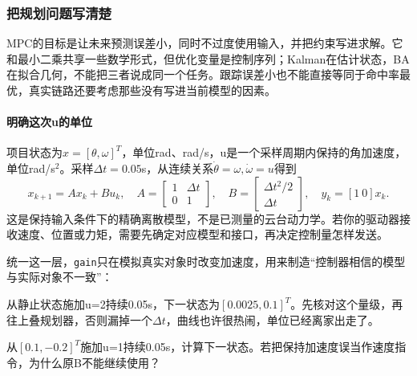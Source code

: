 \subsubsection{把规划问题写清楚}
MPC的目标是让未来预测误差小，同时不过度使用输入，并把约束写进求解。它和最小二乘共享一些数学形式，但优化变量是控制序列；Kalman在估计状态，BA在拟合几何，不能把三者说成同一个任务。跟踪误差小也不能直接等同于命中率最优，真实链路还要考虑那些没有写进当前模型的因素。

\paragraph*{明确这次u的单位}
项目状态为$x=[\theta,\omega]^T$，单位rad、rad/s，u是一个采样周期内保持的角加速度，单位rad/s$^2$。采样$\Delta t=0.05$s，从连续关系$\dot\theta=\omega,\dot\omega=u$得到
\[
x_{k+1}=Ax_k+Bu_k,\quad
A=\begin{bmatrix}1&\Delta t\\0&1\end{bmatrix},\quad
B=\begin{bmatrix}\Delta t^2/2\\\Delta t\end{bmatrix},\quad y_k=[1\ 0]x_k.
\]
这是保持输入条件下的精确离散模型，不是已测量的云台动力学。若你的驱动器接收速度、位置或力矩，需要先确定对应模型和接口，再决定控制量怎样发送。
\begin{example}[先让模拟执行器走一步]
统一这一层，\texttt{gain}只在模拟真实对象时改变加速度，用来制造“控制器相信的模型与实际对象不一致”：

从静止状态施加u=2持续0.05s，下一状态为$[0.0025,0.1]^T$。先核对这个量级，再往上叠规划器，否则漏掉一个$\Delta t$，曲线也许很热闹，单位已经离家出走了。
\end{example}
\begin{exercise}\label{ex:v2-mpc-model}
从$[0.1,-0.2]^T$施加u=1持续0.05s，计算下一状态。若把保持加速度误当作速度指令，为什么原B不能继续使用？
\end{exercise}

